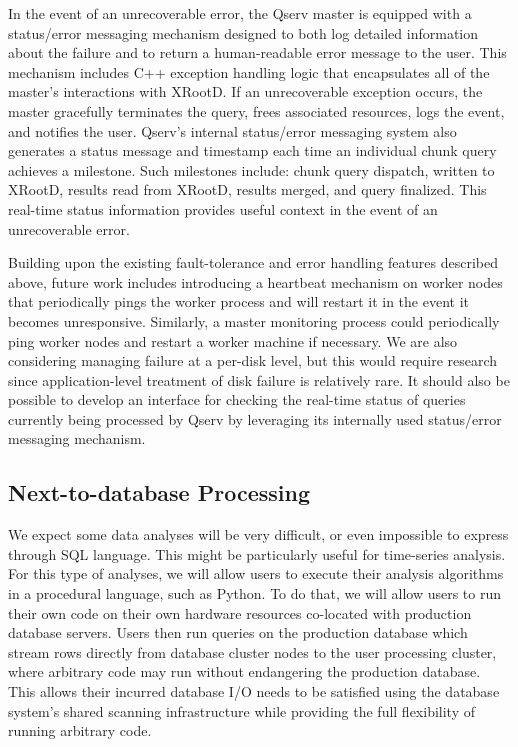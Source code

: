 \documentclass[DM,lsstdraft,toc]{lsstdoc}
\begin{document}
In the event of an unrecoverable error, the Qserv master is equipped with a
status/error messaging mechanism designed to both log detailed information
about the failure and to return a human-readable error message to the user.
This mechanism includes C++ exception handling logic that encapsulates all of
the master's interactions with XRootD. If an unrecoverable exception occurs,
the master gracefully terminates the query, frees associated resources, logs
the event, and notifies the user. Qserv's internal status/error messaging
system also generates a status message and timestamp each time an individual
chunk query achieves a milestone. Such milestones include: chunk query
dispatch, written to XRootD, results read from XRootD, results merged, and
query finalized. This real-time status information provides useful context in
the event of an unrecoverable error.

Building upon the existing fault-tolerance and error handling features
described above, future work includes introducing a heartbeat mechanism on
worker nodes that periodically pings the worker process and will restart it in
the event it becomes unresponsive. Similarly, a master monitoring process
could periodically ping worker nodes and restart a worker machine if
necessary. We are also considering managing failure at a per-disk level, but
this would require research since application-level treatment of disk failure
is relatively rare. It should also be possible to develop an interface for
checking the real-time status of queries currently being processed by Qserv by
leveraging its internally used status/error messaging mechanism.

\subsection{Next-to-database Processing}\label{next-to-database-processing}

We expect some data analyses will be very difficult, or even impossible to
express through SQL language. This might be particularly useful for time-series
analysis. For this type of analyses, we will allow users to execute
their analysis algorithms in a procedural language, such as Python. To do
that, we will allow users to run their own code on their own hardware
resources co-located with production database servers. Users then run queries
on the production database which stream rows directly from database cluster
nodes to the user processing cluster, where arbitrary code may run without
endangering the production database. This allows their incurred database I/O
needs to be satisfied using the database system's shared scanning
infrastructure while providing the full flexibility of running arbitrary code.
\end{document}

